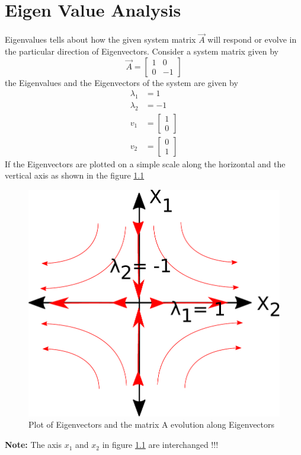 \chapter{Eigen Value Analysis}

Eigenvalues tells about how the given system matrix $\vec{A}$ will respond or evolve in the particular direction of Eigenvectors. Consider a system matrix given by
\begin{equation}
	\vec{A} = \begin{bmatrix}
	1 & 0 \\ 0 & -1
	\end{bmatrix}
\end{equation}
the Eigenvalues and the Eigenvectors of the system are given by
\begin{align*}
	\lambda_{1} & = 1 \\
	\lambda_{2} &= -1 \\
	v_1 & =	\begin{bmatrix}
	1 \\ 0
	\end{bmatrix} \\
	v_2 & =	\begin{bmatrix}
	0 \\ 1
	\end{bmatrix}
\end{align*}
If the Eigenvectors are plotted on a simple scale along the horizontal and the vertical axis as shown in the figure \ref{Fig_EVA_EigenVectorPlot}
\begin{figure}[h!]
	\centering
	\includegraphics[width=\linewidth]{Bilder/EigenVectorPlot.pdf}
	\caption{Plot of Eigenvectors and the matrix A evolution along Eigenvectors}
	\label{Fig_EVA_EigenVectorPlot}
\end{figure}
\newpage
\textbf{Note: }The axis $x_1$ and $x_2$ in figure \ref{Fig_EVA_EigenVectorPlot} are interchanged !!!

